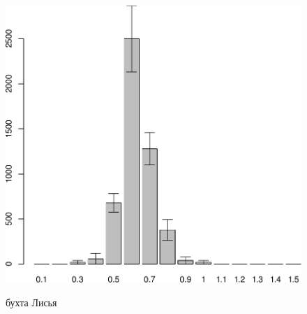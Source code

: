\begin{figure}
\begin{minipage}[b]{.46\linewidth}
\begin{center}
	\end{center}
	\end{minipage}
	\hfil %
	\begin{minipage}[b]{.46\linewidth}
	\begin{center}
		\includegraphics[width=0.21\textheight]{../White_Sea/spat/spat_str_Suhaya_1.pdf}
	\end{center}
	\end{minipage}
%
	\begin{minipage}[b]{\linewidth}
	\begin{center}
		бухта Лисья
	\end{center}
	\end{minipage}
%
	\begin{minipage}[b]{.46\linewidth}
	\begin{center}

\end{center}
\end{minipage}
\end{figure}
